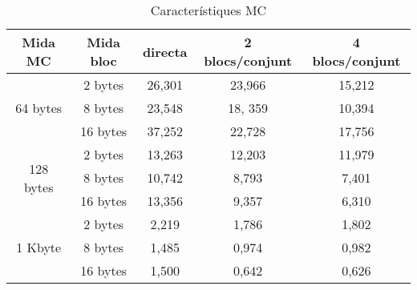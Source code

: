 \documentclass{article}
\begin{document}
\begin{table}[!h]
\begin{tabular}{ |c|c|c|c|c| }
\hline
Mida MC& Mida bloc& directa& 2 blocs/conjunt& 4 blocs/conjunt \\
\hline
\multirow{3}{4em}{64 bytes} & 2 bytes & 26,301 & 23,966 & 15,212 \\
& 8 bytes & 23,548 & 18, 359 & 10,394 \\
& 16 bytes & 37,252 & 22,728 & 17,756 \\
\hline
\multirow{3}{4em}{128 bytes} & 2 bytes & 13,263 & 12,203 & 11,979 \\
& 8 bytes & 10,742 & 8,793 & 7,401 \\
& 16 bytes & 13,356 & 9,357 & 6,310 \\
\hline
\multirow{3}{4em}{1 Kbyte} & 2 bytes & 2,219 & 1,786 & 1,802 \\
& 8 bytes & 1,485 & 0,974 & 0,982 \\
& 16 bytes & 1,500 & 0,642 & 0,626 \\
\hline

\end{tabular}
\caption{Característiques MC}
\label{tab:mc}
\end{table}
\end{document}
